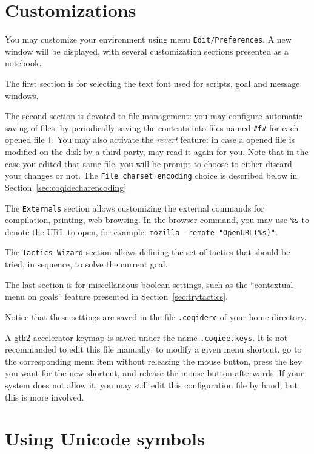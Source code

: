 \section{Customizations}

You may customize your environment using menu
\texttt{Edit/Preferences}. A new window will be displayed, with
several customization sections presented as a notebook. 

The first section is for selecting the text font used for scripts, goal
and message windows. 

The second section is devoted to file management: you may
configure automatic saving of files, by periodically saving the
contents into files named \verb|#f#| for each opened file
\verb|f|. You may also activate the \emph{revert} feature: in case a
opened file is modified on the disk by a third party, \CoqIDE{} may read
it again for you. Note that in the case you edited that same file, you
will be prompt to choose to either discard your changes or not. The
\texttt{File charset encoding} choice is described below in
Section~\ref{sec:coqidecharencoding}
 

The \verb|Externals| section allows customizing the external commands
for compilation, printing, web browsing. In the browser command, you
may use \verb|%s| to denote the URL to open, for example: %
\verb|mozilla -remote "OpenURL(%s)"|. 

The \verb|Tactics Wizard| section allows defining the set of tactics
that should be tried, in sequence, to solve the current goal.

The last section is for miscellaneous boolean settings, such as the
``contextual menu on goals'' feature presented in
Section~\ref{sec:trytactics}. 

Notice that these settings are saved in the file \verb|.coqiderc| of
your home directory. 

A gtk2 accelerator keymap is saved under the name \verb|.coqide.keys|.
It is not recommanded to edit this file manually: to modify a given menu
shortcut, go to the corresponding menu item without releasing the
mouse button, press the key you want for the new shortcut, and release
the mouse button afterwards. If your system does not allow it, you may still 
edit this configuration file by hand, but this is more involved.

\section{Using Unicode symbols}

